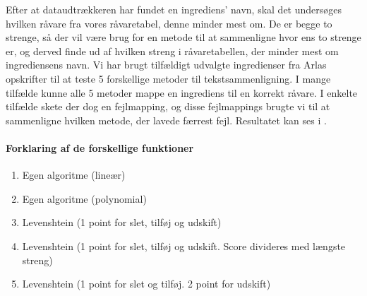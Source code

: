 Efter at dataudtrækkeren har fundet en ingrediens' navn, skal det undersøges hvilken råvare fra vores råvaretabel, denne minder mest om. De er begge to strenge, så der vil være brug for en metode til at sammenligne hvor ens to strenge er, og derved finde ud af hvilken streng i råvaretabellen, der minder mest om ingrediensens navn.
Vi har brugt tilfældigt udvalgte ingredienser fra Arlas opskrifter til at teste 5 forskellige metoder til tekstsammenligning. I mange tilfælde kunne alle 5 metoder mappe en ingrediens til en korrekt råvare. I enkelte tilfælde skete der dog en fejlmapping, og disse fejlmappings brugte vi til at sammenligne hvilken metode, der lavede færrest fejl. Resultatet kan ses i .

\paragraph{Forklaring af de forskellige  funktioner}
\begin{enumerate}
\item Egen algoritme (lineær)
\item Egen algoritme (polynomial)
\item Levenshtein (1 point for slet, tilføj og udskift) %
\item Levenshtein (1 point for slet, tilføj og udskift. Score divideres med længste streng) %
\item Levenshtein (1 point for slet og tilføj. 2 point for udskift) %
\end{enumerate}


